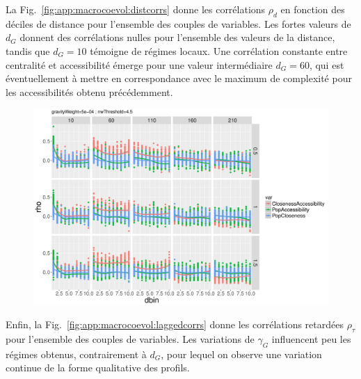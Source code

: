 La Fig.~\ref{fig:app:macrocoevol:distcorrs} donne les corrélations $\rho_d$ en fonction des déciles de distance pour l'ensemble des couples de variables. Les fortes valeurs de $d_G$ donnent des corrélations nulles pour l'ensemble des valeurs de la distance, tandis que $d_G = 10$ témoigne de régimes locaux. Une corrélation constante entre centralité et accessibilité émerge pour une valeur intermédiaire $d_G = 60$, qui est éventuellement à mettre en correspondance avec le maximum de complexité pour les accessibilités obtenu précédemment.


\begin{figure}
\includegraphics[width=\linewidth]{Figures/Final/A-macrocoevol-distcorrs.jpg}
\end{figure}


Enfin, la Fig.~\ref{fig:app:macrocoevol:laggedcorrs} donne les corrélations retardées $\rho_{\tau}$ pour l'ensemble des couples de variables. Les variations de $\gamma_G$ influencent peu les régimes obtenus, contrairement à $d_G$, pour lequel on observe une variation continue de la forme qualitative des profils.

